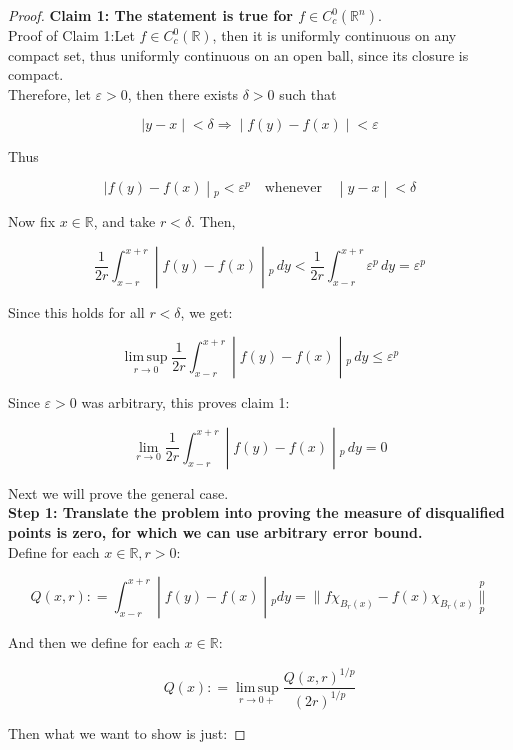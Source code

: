 \begin{proof}

\textbf{Claim 1: The statement is true for \(f \in C_{c}^{0}(\mathbb{R}^{n})\)}.\\
Proof of Claim 1:Let \(f \in C_{c}^{0}(\mathbb{R})\), then it is uniformly continuous on any compact set, thus uniformly continuous on an open ball, since its closure is compact.\\
Therefore, let \(\varepsilon > 0\), then there exists \(\delta > 0\) such that

\[\left. |y - x \middle| < \delta\Longrightarrow \middle| f(y) - f(x) \middle| < \varepsilon \right.\]

Thus

\[\left. |f(y) - f(x) \middle| {}_{p} < \varepsilon^{p}\quad\text{whenever}\quad \middle| y - x \middle| < \delta \right.\]

Now fix \(x \in \mathbb{R}\), and take \(r < \delta\). Then,

\[\left. \frac{1}{2r}\int_{x - r}^{x + r} \middle| f(y) - f(x) \middle| {}_{p}\, dy < \frac{1}{2r}\int_{x - r}^{x + r}\varepsilon^{p}\, dy = \varepsilon^{p} \right.\]

Since this holds for all \(r < \delta\), we get:

\[\left. \operatorname{lim\, sup}\limits_{r\rightarrow 0}\frac{1}{2r}\int_{x - r}^{x + r} \middle| f(y) - f(x) \middle| {}_{p}\, dy \leq \varepsilon^{p} \right.\]

Since \(\varepsilon > 0\) was arbitrary, this proves claim 1:

\[\left. \lim\limits_{r\rightarrow 0}\frac{1}{2r}\int_{x - r}^{x + r} \middle| f(y) - f(x) \middle| {}_{p}\, dy = 0 \right.\]

Next we will prove the general case.\\
\textbf{Step 1: Translate the problem into proving the measure of disqualified points is zero, for which we can use arbitrary error bound.}\\
Define for each \(x \in \mathbb{R},r > 0\):

\[\left. Q(x,r): = \int_{x - r}^{x + r} \middle| f(y) - f(x) \middle| {}_{p} dy = \parallel f\chi_{B_{r}(x)} - f(x)\chi_{B_{r}(x)}\underset{p}{\overset{p}{\parallel}} \right.\]

And then we define for each \(x \in \mathbb{R}\):

\[Q(x): = \operatorname{lim\, sup}\limits_{r\rightarrow 0 +}\frac{Q(x,r)^{1/p}}{(2r)^{1/p}}\]

Then what we want to show is just:


\end{proof}
